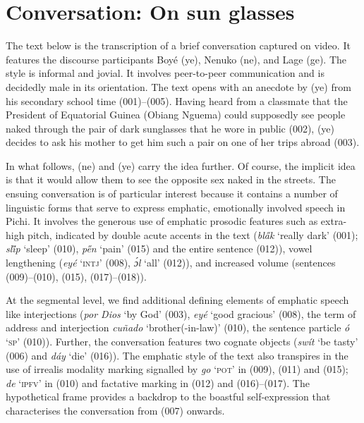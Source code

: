 \section{Conversation: On sun glasses}
\largerpage
The text below is the transcription of a brief conversation captured on video. It features the discourse participants Boyé (ye), Nenuko (ne), and Lage (ge). The style is informal and jovial. It involves peer-to-peer communication and is decidedly male in its orientation. The text opens with an anecdote by (ye) from his secondary school time (001)–(005). Having heard from a classmate that the President of Equatorial Guinea (Obiang Nguema) could supposedly see people naked through the pair of dark sunglasses that he wore in public (002), (ye) decides to ask his mother to get him such a pair on one of her trips abroad (003). 


In what follows, (ne) and (ye) carry the idea further. Of course, the implicit idea is that it would allow them to see the opposite sex naked in the streets. The ensuing conversation is of particular interest because it contains a number of linguistic forms that serve to express emphatic, emotionally involved speech in Pichi. It involves the generous use of emphatic prosodic features such as extra-high pitch, indicated by double acute accents in the text (\textit{bl\H{a}k} ‘really dark’ (001); \textit{sl\H{i}p} ‘sleep’ (010), \textit{p\H{e}n} ‘pain’ (015) and the entire sentence (012)), vowel lengthening (\textit{eyé} ‘\textsc{intj}’ (008), \textit{ɔ́l} ‘all’ (012)), and increased volume (sentences (009)–(010), (015), (017)–(018)). 



At the segmental level, we find additional defining elements of emphatic speech like interjections (\textit{por Dios} ‘by God’ (003), \textit{eyé} ‘good gracious’ (008), the term of address and interjection \textit{cuñado} ‘brother(-in-law)’ (010), the sentence particle \textit{ó} ‘\textsc{sp}’ (010)). Further, the conversation features two cognate objects (\textit{swít} ‘be tasty’ (006) and \textit{dáy} ‘die’ (016)). The emphatic style of the text also transpires in the use of irrealis modality marking signalled by \textit{go} ‘\textsc{pot}’ in (009), (011) and (015); \textit{de} ‘\textsc{ipfv}’ in (010) and factative marking in (012) and (016)–(017). The hypothetical frame provides a backdrop to the boastful self-expression that characterises the conversation from (007) onwards. 



